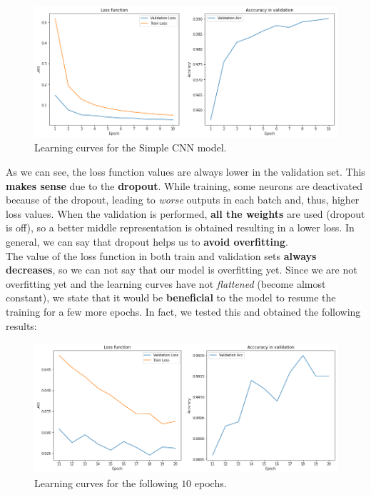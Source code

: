 \documentclass[a4paper]{article}
\begin{document}
\begin{itemize}
        \begin{figure}[H]
          \centering
          \includegraphics[scale = 0.5]{Figures/LearningCurvesSimpleCNN.png}
          \caption{Learning curves for the Simple CNN model.}
        \end{figure}

        As we can see, the loss function values are always lower in the validation set. This \textbf{makes sense} due to the \textbf{dropout}. While training, some neurons are deactivated because of the dropout, leading to \emph{worse} outputs in each batch and, thus, higher loss values. When the validation is performed, \textbf{all the weights} are used (dropout is off), so a better middle representation is obtained resulting in a lower loss. In general, we can say that dropout helps us to \textbf{avoid overfitting}. \\

        The value of the loss function in both train and validation sets  \textbf{always decreases}, so we can not say that our model is overfitting yet. Since we are not overfitting yet and the learning curves have not \emph{flattened} (become almost constant), we state that it would be \textbf{beneficial} to the model to resume the training for a few more epochs. In fact, we tested this and obtained the following results:

        \begin{figure}[H]
          \centering
          \includegraphics[scale = 0.5]{Figures/LearningCurvesSimpleCNN-Longer.png}
          \caption{Learning curves for the following \(10\) epochs.}
        \end{figure}


\end{itemize}
\end{document}
